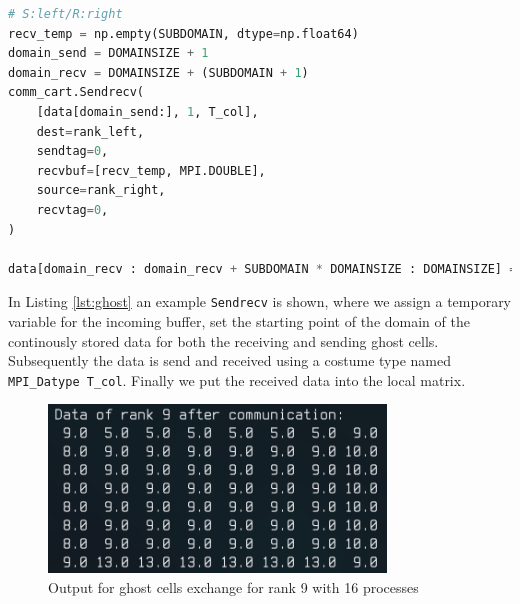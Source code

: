 \begin{lstlisting}[language=Python, label=lst:ghost, caption=Ghost cell Sendrecv example]
# S:left/R:right
recv_temp = np.empty(SUBDOMAIN, dtype=np.float64)
domain_send = DOMAINSIZE + 1
domain_recv = DOMAINSIZE + (SUBDOMAIN + 1)
comm_cart.Sendrecv(
    [data[domain_send:], 1, T_col],
    dest=rank_left,
    sendtag=0,
    recvbuf=[recv_temp, MPI.DOUBLE],
    source=rank_right,
    recvtag=0,
)

data[domain_recv : domain_recv + SUBDOMAIN * DOMAINSIZE : DOMAINSIZE] = recv_temp
\end{lstlisting}
In Listing \ref{lst:ghost} an example \texttt{Sendrecv} is shown, where we assign a temporary variable for the incoming buffer, set the starting point of the domain of the continously stored data for both the receiving and sending ghost cells. Subsequently the data is send and received using a costume type named \texttt{MPI\_Datype T\_col}. Finally we put the received data into the local matrix.
\begin{figure}[H]
	\centering
		\includegraphics[width=0.8\textwidth]{./media/ghost.png}
		\caption{Output for ghost cells exchange for rank 9 with 16 processes}
		\label{fig:ghst}
\end{figure}

